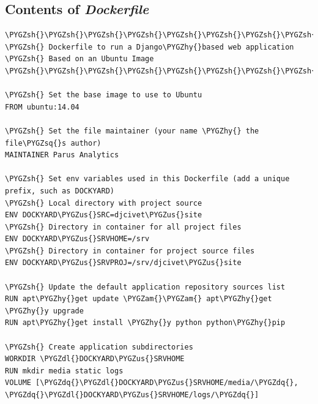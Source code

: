 \documentclass[letterpaper,10pt,english]{sphinxmanual}
\def\PYGZus{\char`\_}
\def\PYGZam{\char`\&}
\def\PYGZsh{\char`\#}
\def\PYGZdl{\char`\$}
\def\PYGZhy{\char`\-}
\def\PYGZsq{\char`\'}
\def\PYGZdq{\char`\"}
\renewcommand\PYGZsq{\textquotesingle}
\begin{document}
\subsection{Contents of \emph{Dockerfile}}
\label{appendix5:contents-of-dockerfile}
\begin{Verbatim}[commandchars=\\\{\}]
\PYGZsh{}\PYGZsh{}\PYGZsh{}\PYGZsh{}\PYGZsh{}\PYGZsh{}\PYGZsh{}\PYGZsh{}\PYGZsh{}\PYGZsh{}\PYGZsh{}\PYGZsh{}\PYGZsh{}\PYGZsh{}\PYGZsh{}\PYGZsh{}\PYGZsh{}\PYGZsh{}\PYGZsh{}\PYGZsh{}\PYGZsh{}\PYGZsh{}\PYGZsh{}\PYGZsh{}\PYGZsh{}\PYGZsh{}\PYGZsh{}\PYGZsh{}\PYGZsh{}\PYGZsh{}\PYGZsh{}\PYGZsh{}\PYGZsh{}\PYGZsh{}\PYGZsh{}\PYGZsh{}\PYGZsh{}\PYGZsh{}\PYGZsh{}\PYGZsh{}\PYGZsh{}\PYGZsh{}\PYGZsh{}\PYGZsh{}\PYGZsh{}\PYGZsh{}\PYGZsh{}\PYGZsh{}\PYGZsh{}\PYGZsh{}\PYGZsh{}\PYGZsh{}\PYGZsh{}\PYGZsh{}\PYGZsh{}\PYGZsh{}\PYGZsh{}\PYGZsh{}\PYGZsh{}\PYGZsh{}
\PYGZsh{} Dockerfile to run a Django\PYGZhy{}based web application
\PYGZsh{} Based on an Ubuntu Image
\PYGZsh{}\PYGZsh{}\PYGZsh{}\PYGZsh{}\PYGZsh{}\PYGZsh{}\PYGZsh{}\PYGZsh{}\PYGZsh{}\PYGZsh{}\PYGZsh{}\PYGZsh{}\PYGZsh{}\PYGZsh{}\PYGZsh{}\PYGZsh{}\PYGZsh{}\PYGZsh{}\PYGZsh{}\PYGZsh{}\PYGZsh{}\PYGZsh{}\PYGZsh{}\PYGZsh{}\PYGZsh{}\PYGZsh{}\PYGZsh{}\PYGZsh{}\PYGZsh{}\PYGZsh{}\PYGZsh{}\PYGZsh{}\PYGZsh{}\PYGZsh{}\PYGZsh{}\PYGZsh{}\PYGZsh{}\PYGZsh{}\PYGZsh{}\PYGZsh{}\PYGZsh{}\PYGZsh{}\PYGZsh{}\PYGZsh{}\PYGZsh{}\PYGZsh{}\PYGZsh{}\PYGZsh{}\PYGZsh{}\PYGZsh{}\PYGZsh{}\PYGZsh{}\PYGZsh{}\PYGZsh{}\PYGZsh{}\PYGZsh{}\PYGZsh{}\PYGZsh{}\PYGZsh{}\PYGZsh{}

\PYGZsh{} Set the base image to use to Ubuntu
FROM ubuntu:14.04

\PYGZsh{} Set the file maintainer (your name \PYGZhy{} the file\PYGZsq{}s author)
MAINTAINER Parus Analytics

\PYGZsh{} Set env variables used in this Dockerfile (add a unique prefix, such as DOCKYARD)
\PYGZsh{} Local directory with project source
ENV DOCKYARD\PYGZus{}SRC=djcivet\PYGZus{}site
\PYGZsh{} Directory in container for all project files
ENV DOCKYARD\PYGZus{}SRVHOME=/srv
\PYGZsh{} Directory in container for project source files
ENV DOCKYARD\PYGZus{}SRVPROJ=/srv/djcivet\PYGZus{}site

\PYGZsh{} Update the default application repository sources list
RUN apt\PYGZhy{}get update \PYGZam{}\PYGZam{} apt\PYGZhy{}get \PYGZhy{}y upgrade
RUN apt\PYGZhy{}get install \PYGZhy{}y python python\PYGZhy{}pip

\PYGZsh{} Create application subdirectories
WORKDIR \PYGZdl{}DOCKYARD\PYGZus{}SRVHOME
RUN mkdir media static logs
VOLUME [\PYGZdq{}\PYGZdl{}DOCKYARD\PYGZus{}SRVHOME/media/\PYGZdq{}, \PYGZdq{}\PYGZdl{}DOCKYARD\PYGZus{}SRVHOME/logs/\PYGZdq{}]


\end{Verbatim}
\end{document}
